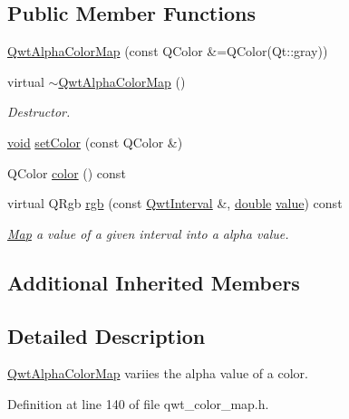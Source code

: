 \subsection*{Public Member Functions}
\begin{DoxyCompactItemize}
\item 
\hyperlink{class_qwt_alpha_color_map_af78213a5ff1ebef8a8d4447b0987bf32}{Qwt\-Alpha\-Color\-Map} (const Q\-Color \&=Q\-Color(Qt\-::gray))
\item 
virtual \hyperlink{class_qwt_alpha_color_map_ac6445d25b9df0b565383b8189691bbad}{$\sim$\-Qwt\-Alpha\-Color\-Map} ()
\begin{DoxyCompactList}\small\item\em Destructor. \end{DoxyCompactList}\item 
\hyperlink{group___u_a_v_objects_plugin_ga444cf2ff3f0ecbe028adce838d373f5c}{void} \hyperlink{class_qwt_alpha_color_map_a372ba8791102270991473897fb36a965}{set\-Color} (const Q\-Color \&)
\item 
Q\-Color \hyperlink{class_qwt_alpha_color_map_a4a706714abbd4d82a9a2201a9ecf7aaf}{color} () const 
\item 
virtual Q\-Rgb \hyperlink{class_qwt_alpha_color_map_a2f0ce2bdaecf7e74b635b8433ed733d5}{rgb} (const \hyperlink{class_qwt_interval}{Qwt\-Interval} \&, \hyperlink{_super_l_u_support_8h_a8956b2b9f49bf918deed98379d159ca7}{double} \hyperlink{glext_8h_aa0e2e9cea7f208d28acda0480144beb0}{value}) const 
\begin{DoxyCompactList}\small\item\em \hyperlink{class_map}{Map} a value of a given interval into a alpha value. \end{DoxyCompactList}\end{DoxyCompactItemize}
\subsection*{Additional Inherited Members}


\subsection{Detailed Description}
\hyperlink{class_qwt_alpha_color_map}{Qwt\-Alpha\-Color\-Map} variies the alpha value of a color. 

Definition at line 140 of file qwt\-\_\-color\-\_\-map.\-h.



